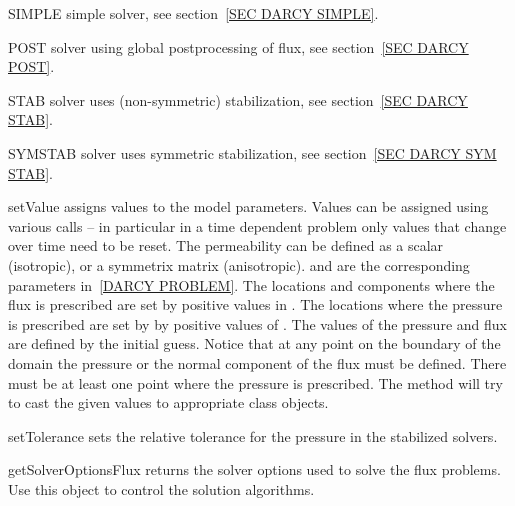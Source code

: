 \begin{memberdesc}[DarcyFlow]{SIMPLE}
simple solver, see section~\ref{SEC DARCY SIMPLE}.
\end{memberdesc}

\begin{memberdesc}[DarcyFlow]{POST}
solver using global postprocessing of flux, see section~\ref{SEC DARCY POST}. 
\end{memberdesc}

\begin{memberdesc}[DarcyFlow]{STAB}
 solver uses (non-symmetric) stabilization, see section~\ref{SEC DARCY STAB}. 
\end{memberdesc}

\begin{memberdesc}[DarcyFlow]{SYMSTAB}
 solver uses symmetric stabilization, see section~\ref{SEC DARCY SYM STAB}.   
\end{memberdesc}

\begin{methoddesc}[DarcyFlow]{setValue}{}
assigns values to the model parameters. Values can be assigned using various
calls -- in particular in a time dependent problem only values that change
over time need to be reset. The permeability can be defined as a scalar
(isotropic), or a symmetrix matrix (anisotropic).
 and  are the corresponding parameters in~\ref{DARCY PROBLEM}.
The locations and components where the flux is prescribed are set by positive
values in .
The locations where the pressure is prescribed are set by by positive values
of .
The values of the pressure and flux are defined by the initial guess.
Notice that at any point on the boundary of the domain the pressure or the
normal component of the flux must be defined. There must be at least one point
where the pressure is prescribed.
The method will try to cast the given values to appropriate \Data class objects.
\end{methoddesc}

\begin{methoddesc}[DarcyFlow]{setTolerance}{}
sets the relative tolerance  for the pressure in the stabilized solvers.
\end{methoddesc}


\begin{methoddesc}[DarcyFlow]{getSolverOptionsFlux}{}
returns the solver options used to solve the flux problems.
Use this \SolverOptions object to control the solution algorithms.
\end{methoddesc}

